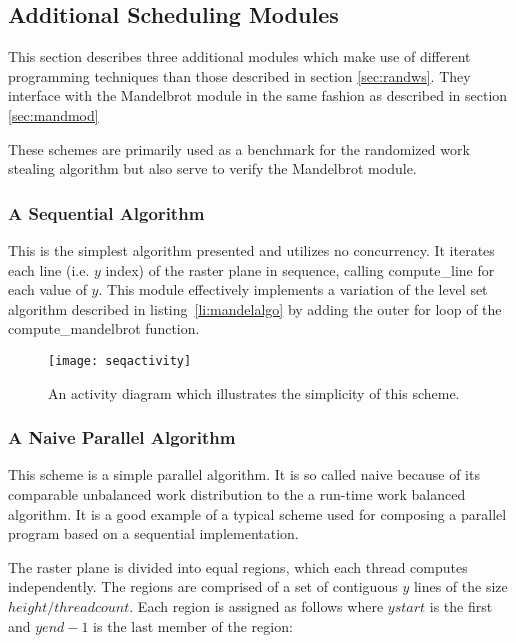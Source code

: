 \subsection{Additional Scheduling Modules}

This section describes three additional modules which make use of different programming 
techniques than those described in section \ref{sec:randws}. 
They interface with the Mandelbrot module in the same fashion as described in section \ref{sec:mandmod}

These schemes are primarily used as a benchmark for the randomized work stealing algorithm but also 
serve to verify the Mandelbrot module.

\subsubsection*{A Sequential Algorithm}

This is the simplest algorithm presented and utilizes no concurrency.
It iterates each line (i.e. \(y\) index) of the raster plane in sequence, calling compute\_line for each value of \(y\).
This module effectively implements a variation of the level set algorithm described in listing~\ref{li:mandelalgo}
by adding the outer for loop of the compute\_mandelbrot function.

\begin{figure}[h]
\centering
\texttt{[image: seqactivity]}
\caption{
    An activity diagram which illustrates the simplicity of this scheme.
}
\label{fig:seqactivity}
\end{figure}

\subsubsection*{A Naive Parallel Algorithm}

This scheme is a simple parallel algorithm. It is so called naive because of its comparable unbalanced work distribution to
the a run-time work balanced algorithm. It is a good example of a typical scheme used for composing a parallel program based on a 
sequential implementation.

The raster plane is divided into equal regions, which each thread computes independently.
The regions are comprised of a set of contiguous \(y\) lines of the size \(height / threadcount\).
Each region is assigned as follows where \(ystart\) is the first and \(yend - 1\) is the last member of the region: 

